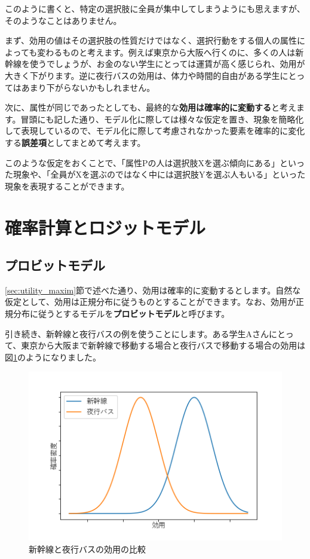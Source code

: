 このように書くと、特定の選択肢に全員が集中してしまうようにも思えますが、そのようなことはありません。

まず、効用の値はその選択肢の性質だけではなく、選択行動をする個人の属性によっても変わるものと考えます。例えば東京から大阪へ行くのに、多くの人は新幹線を使うでしょうが、お金のない学生にとっては運賃が高く感じられ、効用が大きく下がります。逆に夜行バスの効用は、体力や時間的自由がある学生にとってはあまり下がらないかもしれません。

次に、属性が同じであったとしても、最終的な\textbf{効用は確率的に変動する}と考えます。冒頭にも記した通り、モデル化に際しては様々な仮定を置き、現象を簡略化して表現しているので、モデル化に際して考慮されなかった要素を確率的に変化する\textbf{誤差項}としてまとめて考えます。

このような仮定をおくことで、「属性Pの人は選択肢Xを選ぶ傾向にある」といった現象や、「全員がXを選ぶのではなく中には選択肢Yを選ぶ人もいる」といった現象を表現することができます。

\section{確率計算とロジットモデル}\label{sec:mnl}

\subsection{プロビットモデル}\label{ssec:probit}

\ref{sec:utility_maxim}節で述べた通り、効用は確率的に変動するとします。自然な仮定として、効用は正規分布に従うものとすることができます。なお、効用が正規分布に従うとするモデルを\textbf{プロビットモデル}と呼びます。

引き続き、新幹線と夜行バスの例を使うことにします。ある学生Aさんにとって、東京から大阪まで新幹線で移動する場合と夜行バスで移動する場合の効用は図\ref{fig:norm1}のようになりました。

\begin{figure}[ht]
    \centering
    \includegraphics[width=0.5\hsize]{figure/norm1.png}
    \caption{新幹線と夜行バスの効用の比較}
    \label{fig:norm1}
\end{figure}

